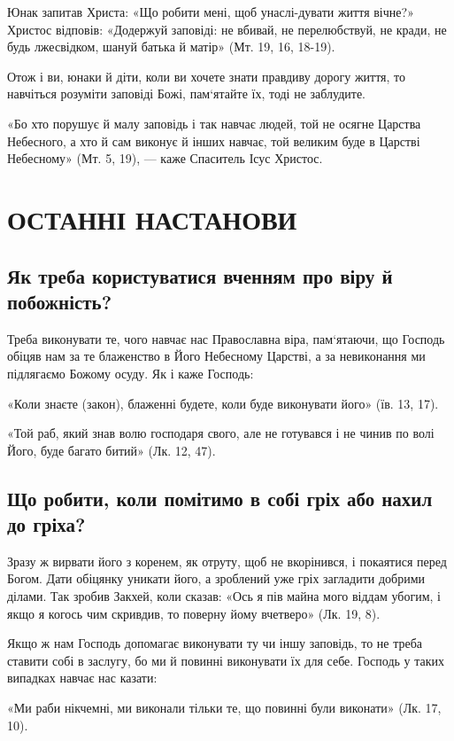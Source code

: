 \documentclass[main.tex]{subfiles}
\begin{document}
Юнак запитав Христа: «Що робити мені, щоб унаслі-дувати життя вічне?» Христос відповів: «Додержуй заповіді: не вбивай, не перелюбствуй, не кради, не будь лжесвідком, шануй батька й матір» (Мт. 19, 16, 18-19).

Отож і ви, юнаки й діти, коли ви хочете знати правдиву дорогу життя, то навчіться розуміти заповіді Божі, пам`ятайте їх, тоді не заблудите.

«Бо хто порушує й малу заповідь і так навчає людей, той не осягне Царства Небесного, а хто й сам виконує й інших навчає, той великим буде в Царстві Небесному» (Мт. 5, 19), — каже Спаситель Ісус Христос.

\section{ОСТАННІ НАСТАНОВИ}

\subsection{Як треба користуватися вченням про віру й побожність?}

Треба виконувати те, чого навчає нас Православна віра, пам`ятаючи, що Господь обіцяв нам за те блаженство в Його Небесному Царстві, а за невиконання ми підлягаємо Божому осуду. Як і каже Господь:

«Коли знаєте (закон), блаженні будете, коли буде виконувати його» (їв. 13, 17).

«Той раб, який знав волю господаря свого, але не готувався і не чинив по волі Його, буде багато битий» (Лк. 12, 47).

\subsection{Що робити, коли помітимо в собі гріх або нахил до гріха?}

Зразу ж вирвати його з коренем, як отруту, щоб не вкорінився, і покаятися перед Богом. Дати обіцянку уникати його, а зроблений уже гріх загладити добрими ділами. Так зробив Закхей, коли сказав: «Ось я пів майна мого віддам убогим, і якщо я когось чим скривдив, то поверну йому вчетверо» (Лк. 19, 8).

Якщо ж нам Господь допомагає виконувати ту чи іншу заповідь, то не треба ставити собі в заслугу, бо ми й повинні виконувати їх для себе. Господь у таких випадках навчає нас казати:

«Ми раби нікчемні, ми виконали тільки те, що повинні були виконати» (Лк. 17, 10).
\end{document}
